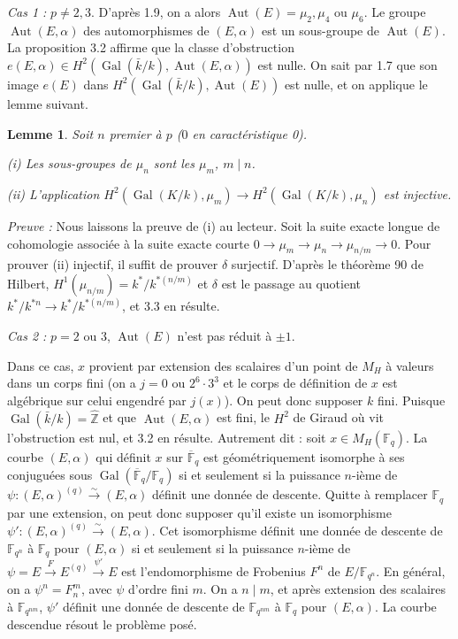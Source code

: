 \documentclass[10pt,a4paper]{amsart}
\theoremstyle{plain}
\newtheorem{lemma}[theorem]{Lemme}
\theoremstyle{definition}
\DeclareMathOperator{\Aut}{Aut}
\newcommand{\FF}{\mathbb{F}}
\newcommand{\F}{\mathbb{F}}
\newcommand{\ZZ}{\mathbb{Z}}
\DeclareMathOperator{\Gal}{Gal}
\begin{document}
\emph{Cas 1 :} $p \not= 2, 3$. D'apr\`es 1.9, on a alors $\Aut(E) = \mu_2, \mu_4$ ou $\mu_6$. Le groupe $\Aut(E,\alpha)$ des automorphismes de $(E,\alpha)$ est un sous-groupe de $\Aut(E)$. La proposition 3.2 affirme que la classe d'obstruction $e(E,\alpha) \in H^2(\Gal(\bar{k}/k), \Aut(E,\alpha))$ est nulle. On sait par 1.7 que son image $e(E)$ dans $H^2(\Gal(\bar{k}/k), \Aut(E))$ est nulle, et on applique le lemme suivant.

\setcounter{theorem}{2}
\begin{lemma}
Soit $n$ premier \`a $p$ ($0$ en caract\'eristique 0).

\emph{(i)} Les sous-groupes de $\mu_n$ sont les $\mu_m$, $m \mid n$.

\emph{(ii)} L'application $H^2(\Gal(K/k), \mu_m) \to H^2(\Gal(K/k), \mu_n)$ est injective.
\end{lemma}

\noindent\emph{Preuve :} Nous laissons la preuve de (i) au lecteur. Soit la suite exacte longue de cohomologie associ\'ee \`a la suite exacte courte $0 \to \mu_m \to \mu_n \to \mu_{n/m} \to 0$. Pour prouver (ii) injectif, il suffit de prouver $\delta$ surjectif. D'apr\`es le th\'eor\`eme 90 de Hilbert, $H^1(\mu_{n/m}) = k^*/k^{*(n/m)}$ et $\delta$ est le passage au quotient $k^*/k^{*n} \to k^*/k^{*(n/m)}$, et 3.3 en r\'esulte.

\emph{Cas 2 :} $p = 2$ ou $3$, $\Aut(E)$ n'est pas r\'eduit \`a $\pm 1$.

Dans ce cas, $x$ provient par extension des scalaires d'un point de $M_H$ \`a valeurs dans un corps fini (on a $j = 0$ ou $2^6 \cdot 3^3$ et le corps de d\'efinition de $x$ est alg\'ebrique sur celui engendr\'e par $j(x)$). On peut donc supposer $k$ fini. Puisque $\Gal(\bar{k}/k) = \hat{\ZZ}$ et que $\Aut(E,\alpha)$ est fini, le $H^2$ de Giraud o\`u vit l'obstruction est nul, et 3.2 en r\'esulte. Autrement dit : soit $x \in M_H(\FF_q)$. La courbe $(E,\alpha)$ qui d\'efinit $x$ sur $\overline{\FF}_q$ est g\'eom\'etriquement isomorphe \`a ses conjugu\'ees sous $\Gal(\overline{\FF}_q/\F_q)$ si et seulement si la puissance $n$-i\`eme de $\psi : (E,\alpha)^{(q)} \xrightarrow{\sim} (E,\alpha)$ d\'efinit une donn\'ee de descente. Quitte \`a remplacer $\F_q$ par une extension, on peut donc supposer qu'il existe un isomorphisme $\psi' : (E,\alpha)^{(q)} \xrightarrow{\sim} (E,\alpha)$. Cet isomorphisme d\'efinit une donn\'ee de descente de $\F_{q^n}$ \`a $\F_q$ pour $(E,\alpha)$ si et seulement si la puissance $n$-i\`eme de $\psi = E \xrightarrow{F} E^{(q)} \xrightarrow{\psi'} E$ est l'endomorphisme de Frobenius $F^n$ de $E/\F_{q^n}$. En g\'en\'eral, on a $\psi^n = F_n^m$, avec $\psi$ d'ordre fini $m$. On a $n \mid m$, et apr\`es extension des scalaires \`a $\F_{q^{nm}}$, $\psi'$ d\'efinit une donn\'ee de descente de $\F_{q^{nm}}$ \`a $\F_q$ pour $(E,\alpha)$. La courbe descendue r\'esout le probl\`eme pos\'e.
\end{document}
